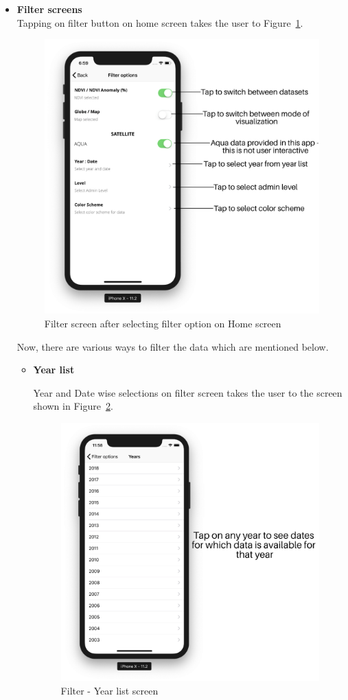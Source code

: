 \begin{itemize}
    
   \item \textbf{Filter screens} \\
    Tapping on filter button on home screen takes the user to Figure~\ref{fig:filter_screen}.
    
    \begin{figure}[H]
            \centering
            \includegraphics[width=0.50\linewidth]{figures/ch2/filter_screen.png}
            \caption{\label{fig:filter_screen} Filter screen after selecting filter option on Home screen}
    \end{figure}
    
    Now, there are various ways to filter the data which are mentioned below.
   
    \begin{itemize}
        \item \textbf{Year list}
        
        Year and Date wise selections on filter screen takes the user to the screen shown in Figure~\ref{fig:years_list_screen}.
        
         \begin{figure}[H]
            \centering
            \includegraphics[width=0.50\linewidth]{figures/ch2/year_list.png}
            \caption{\label{fig:years_list_screen} Filter - Year list screen}
         \end{figure}
   

\end{itemize}
\end{itemize}
